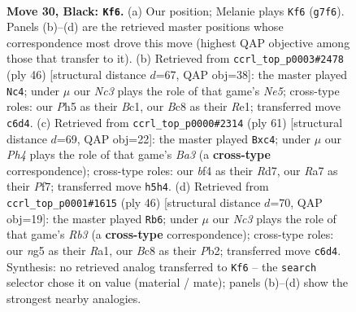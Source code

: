 \documentclass[11pt]{article}
\begin{document}
\clearpage

\begin{figure}[p]\centering
\begin{subfigure}{0.46\textwidth}\centering
\resizebox{\linewidth}{!}{%
\newchessgame
\chessboard[
  setfen={2b4r/r5k1/pnn1P1p1/p2B1pNp/5B2/P4PP1/1P5P/RK1R4 b - - 2 30},
  showmover=false,
  pgfstyle=straightmove, color=movearrow, markmove={g7-f6}
]}
\caption{}
\end{subfigure}\hfill
\begin{subfigure}{0.46\textwidth}\centering
\resizebox{\linewidth}{!}{%
\newchessgame
\chessboard[
  setfen={5rk1/2p2pp1/r2bp2p/p3N2b/4P3/P2R4/1P3PPP/2B1R1K1 w - - 4 24},
  showmover=false,
  pgfstyle=straightmove, color=movearrow, markmove={e5-c4}
]}
\caption{}
\end{subfigure}
\\[4pt]
\begin{subfigure}{0.46\textwidth}\centering
\resizebox{\linewidth}{!}{%
\newchessgame
\chessboard[
  setfen={3r2k1/3r1pp1/b1n1p2p/p3P3/PbP5/1NB1RN1P/1P3PP1/R5K1 b - - 0 31},
  showmover=false,
  pgfstyle=straightmove, color=movearrow, markmove={a6-c4}
]}
\caption{}
\end{subfigure}\hfill
\begin{subfigure}{0.46\textwidth}\centering
\resizebox{\linewidth}{!}{%
\newchessgame
\chessboard[
  setfen={r3r1k1/1p3p1p/2p2pb1/p1n5/P2N2P1/1R5P/1P2PPB1/R5K1 w - - 1 24},
  showmover=false,
  pgfstyle=straightmove, color=movearrow, markmove={b3-b6}
]}
\caption{}
\end{subfigure}
\caption{\textbf{Move 30, Black: \texttt{Kf6}.} (a) Our position; Melanie plays \texttt{Kf6} (\texttt{g7f6}). Panels (b)--(d) are the retrieved master positions whose correspondence most drove this move (highest QAP objective among those that transfer to it). (b) Retrieved from \texttt{ccrl\_top\_p0003\#2478} (ply 46) [structural distance $d$=67, QAP obj=38]: the master played \texttt{Nc4}; under $\mu$ our \emph{Nc3} plays the role of that game's \emph{Ne5}; cross-type roles: our \emph{P}h5 as their \emph{B}c1, our \emph{B}c8 as their \emph{R}e1; transferred move \texttt{c6d4}. (c) Retrieved from \texttt{ccrl\_top\_p0000\#2314} (ply 61) [structural distance $d$=69, QAP obj=22]: the master played \texttt{Bxc4}; under $\mu$ our \emph{Ph4} plays the role of that game's \emph{Ba3} (a \textbf{cross-type} correspondence); cross-type roles: our \emph{b}f4 as their \emph{R}d7, our \emph{R}a7 as their \emph{P}f7; transferred move \texttt{h5h4}. (d) Retrieved from \texttt{ccrl\_top\_p0001\#1615} (ply 46) [structural distance $d$=70, QAP obj=19]: the master played \texttt{Rb6}; under $\mu$ our \emph{Nc3} plays the role of that game's \emph{Rb3} (a \textbf{cross-type} correspondence); cross-type roles: our \emph{n}g5 as their \emph{R}a1, our \emph{B}c8 as their \emph{P}b2; transferred move \texttt{c6d4}. Synthesis: no retrieved analog transferred to \texttt{Kf6} -- the \texttt{search} selector chose it on value (material / mate); panels (b)--(d) show the strongest nearby analogies.}
\label{fig:thought-m59}
\end{figure}
\end{document}
